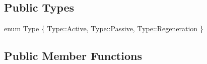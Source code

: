 \subsection*{Public Types}
\begin{DoxyCompactItemize}
\item 
enum \hyperlink{classZeta_1_1AbilityClass_a371c2c662780f1c4a796a3332d6568b3}{Type} \{ \hyperlink{classZeta_1_1AbilityClass_a371c2c662780f1c4a796a3332d6568b3a4d3d769b812b6faa6b76e1a8abaece2d}{Type\+::\+Active}, 
\hyperlink{classZeta_1_1AbilityClass_a371c2c662780f1c4a796a3332d6568b3af80bc338b6146b566004a046f8137c85}{Type\+::\+Passive}, 
\hyperlink{classZeta_1_1AbilityClass_a371c2c662780f1c4a796a3332d6568b3a93fb94ede88fe65704d75647dfc6595f}{Type\+::\+Regeneration}
 \}
\end{DoxyCompactItemize}
\subsection*{Public Member Functions}
